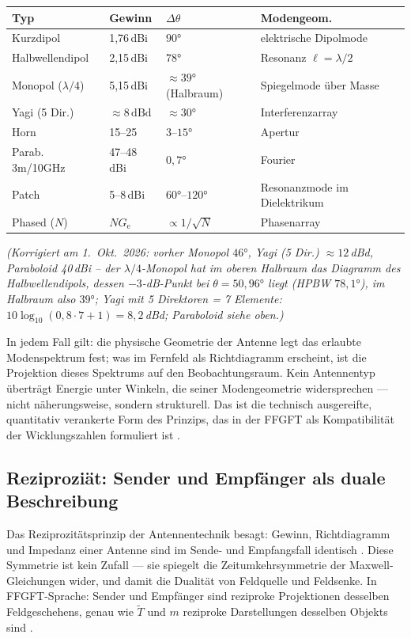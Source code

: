 {\setlength{\hfuzz}{8pt}%
\begin{center}
\begin{tabular}{@{}lp{1.5cm}p{1.6cm}p{2.1cm}@{}}
\toprule
\textbf{Typ} & \textbf{Gewinn} & \textbf{$\Delta\theta$}
             & \textbf{Modengeom.} \\
\midrule
Kurzdipol     & 1,76\,dBi  & $90°$         & elektrische Dipolmode \\
Halbwellendipol & 2,15\,dBi & $78°$       & Resonanz $\ell=\lambda/2$ \\
Monopol ($\lambda/4$) & 5,15\,dBi & ${\approx}39°$ (Halbraum) & Spiegelmode über Masse \\
Yagi (5 Dir.) & ${\approx}8\,\mathrm{dBd}$ & ${\approx}30°$ & Interferenzarray \\
Horn & 15--25 & $3$--$15°$ & Apertur\\
Parab. 3m/10GHz & 47--48\,dBi & $0{,}7°$ & Fourier \\
Patch         & 5--8\,dBi  & $60°$--$120°$ & Resonanzmode im Dielektrikum \\
Phased ($N$) & $N G_\mathrm{e}$ & $\propto 1/\sqrt{N}$ & Phasenarray \\
\bottomrule
\end{tabular}
\end{center}}%
\textit{(Korrigiert am 1.~Okt.~2026: vorher Monopol $46°$, Yagi (5 Dir.) ${\approx}12$\,dBd, Paraboloid 40\,dBi -- der $\lambda/4$-Monopol hat im oberen Halbraum das Diagramm des Halbwellendipols, dessen $-3$-dB-Punkt bei $\theta = 50{,}96°$ liegt (HPBW $78{,}1°$), im Halbraum also $39°$; Yagi mit 5 Direktoren = 7 Elemente: $10\log_{10}(0{,}8\cdot7+1) = 8{,}2$\,dBd; Paraboloid siehe oben.)}

In jedem Fall gilt: die physische Geometrie der Antenne legt das erlaubte
Modenspektrum fest; was im Fernfeld als Richtdiagramm erscheint, ist die
Projektion dieses Spektrums auf den Beobachtungsraum. Kein Antennentyp
überträgt Energie unter Winkeln, die seiner Modengeometrie widersprechen ---
nicht näherungsweise, sondern strukturell. Das ist die technisch ausgereifte,
quantitativ verankerte Form des Prinzips, das in der FFGFT als Kompatibilität
der Wicklungszahlen formuliert ist \SM.

\subsection*{Reziproziät: Sender und Empfänger als duale Beschreibung}

Das Reziprozitätsprinzip der Antennentechnik besagt: Gewinn, Richtdiagramm
und Impedanz einer Antenne sind im Sende- und Empfangsfall identisch \cite{Balanis2016,Griffiths1999}.
Diese Symmetrie ist kein Zufall --- sie spiegelt die Zeitumkehrsymmetrie
der Maxwell-Gleichungen wider, und damit die Dualität von Feldquelle und
Feldsenke. In FFGFT-Sprache: Sender und Empfänger sind reziproke
Projektionen desselben Feldgeschehens, genau wie $\tilde{T}$ und $m$
reziproke Darstellungen desselben Objekts sind \SM.

